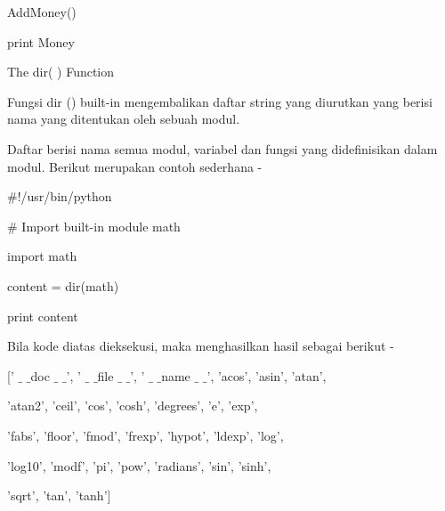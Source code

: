 \noindent 
 \hspace*{0.5in} AddMoney() \par
\noindent 
 \hspace*{0.5in} print Money \par
\vspace{12pt}
\noindent 
The dir( ) Function \par
\noindent 
Fungsi dir () built-in mengembalikan daftar string yang diurutkan yang berisi nama yang ditentukan oleh sebuah modul. \par
\noindent 
Daftar berisi nama semua modul, variabel dan fungsi yang didefinisikan dalam modul. Berikut merupakan contoh sederhana - \par
\noindent 
 \hspace*{0.5in}  $  \#  $!/usr/bin/python \par
\vspace{12pt}
\noindent 
 \hspace*{0.5in}  $  \#  $ Import built-in module math \par
\noindent 
 \hspace*{0.5in} import math \par
\vspace{12pt}
\noindent 
 \hspace*{0.5in} content = dir(math) \par
\vspace{12pt}
\noindent 
 \hspace*{0.5in} print content \par
\noindent 
Bila kode diatas dieksekusi, maka menghasilkan hasil sebagai berikut - \par
\noindent 
 \hspace*{0.5in} [' $  \_  $ $  \_  $doc $  \_  $ $  \_  $', ' $  \_  $ $  \_  $file $  \_  $ $  \_  $', ' $  \_  $ $  \_  $name $  \_  $ $  \_  $', 'acos', 'asin', 'atan',  \par
\noindent 
 \hspace*{0.5in} 'atan2', 'ceil', 'cos', 'cosh', 'degrees', 'e', 'exp',  \par
\noindent 
 \hspace*{0.5in} 'fabs', 'floor', 'fmod', 'frexp', 'hypot', 'ldexp', 'log', \par
\noindent 
 \hspace*{0.5in} 'log10', 'modf', 'pi', 'pow', 'radians', 'sin', 'sinh',  \par
\noindent 
 \hspace*{0.5in} 'sqrt', 'tan', 'tanh'] \par
